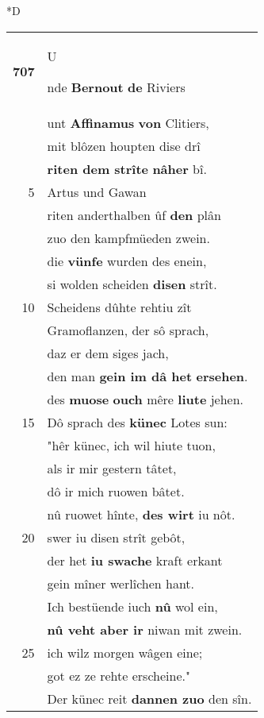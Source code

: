 \documentclass[8pt,a4paper,notitlepage]{article}
\begin{document}
\begin{table}[ht]
\begin{minipage}[t]{0.5\linewidth}
\small
\begin{center}*D
\end{center}
\begin{tabular}{rl}
\textbf{707} & \begin{large}U\end{large}nde \textbf{Bernout} \textbf{de} Riviers\\ 
 & unt \textbf{Affinamus} \textbf{von} Clitiers,\\ 
 & mit blôzen houpten dise drî\\ 
 & \textbf{riten dem strîte} \textbf{nâher} bî.\\ 
5 & Artus und Gawan\\ 
 & riten anderthalben ûf \textbf{den} plân\\ 
 & zuo den kampfmüeden zwein.\\ 
 & die \textbf{vünfe} wurden des enein,\\ 
 & si wolden scheiden \textbf{disen} strît.\\ 
10 & Scheidens dûhte rehtiu zît\\ 
 & Gramoflanzen, der sô sprach,\\ 
 & daz er dem siges jach,\\ 
 & den man \textbf{gein im dâ het} \textbf{ersehen}.\\ 
 & des \textbf{muose} \textbf{ouch} mêre \textbf{liute} jehen.\\ 
15 & Dô sprach des \textbf{künec} Lotes sun:\\ 
 & "hêr künec, ich wil hiute tuon,\\ 
 & als ir mir gestern tâtet,\\ 
 & dô ir mich ruowen bâtet.\\ 
 & nû ruowet hînte, \textbf{des wirt} iu nôt.\\ 
20 & swer iu disen strît gebôt,\\ 
 & der het \textbf{iu swache} kraft erkant\\ 
 & gein mîner werlîchen hant.\\ 
 & Ich bestüende iuch \textbf{nû} wol ein,\\ 
 & \textbf{nû veht aber ir} niwan mit zwein.\\ 
25 & ich wilz morgen wâgen eine;\\ 
 & got ez ze rehte erscheine."\\ 
 & Der künec reit \textbf{dannen zuo} den sîn.\\ 

\end{tabular}
\end{minipage}
\end{table}
\end{document}
